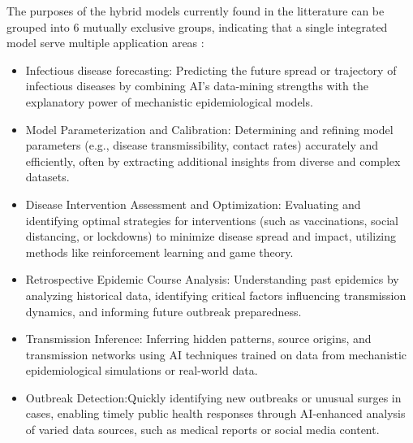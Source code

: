 The purposes of the hybrid models currently found in the litterature can be grouped into 6 mutually exclusive groups, indicating that a single integrated model serve multiple application areas \cite{Ye2025} :
\begin{itemize}
    \item Infectious disease forecasting: Predicting the future spread or trajectory of infectious diseases by combining AI's data-mining strengths with the explanatory power of mechanistic epidemiological models. \cite{Poirier2020, Fan2022, Garner2016, Kharazmi2021, Barmparis2022}
    \item Model Parameterization and Calibration: Determining and refining model parameters (e.g., disease transmissibility, contact rates) accurately and efficiently, often by extracting additional insights from diverse and complex datasets. \cite{Tuarob2015, SolaresHernandez2023, Reiker2021, Jorgensen2022, Raissi2019}
    \item Disease Intervention Assessment and Optimization: Evaluating and identifying optimal strategies for interventions (such as vaccinations, social distancing, or lockdowns) to minimize disease spread and impact, utilizing methods like reinforcement learning and game theory. \cite{Thiagarajan2022, Bertsimas2021, Aurell2022, Janko2023}
    \item Retrospective Epidemic Course Analysis: Understanding past epidemics by analyzing historical data, identifying critical factors influencing transmission dynamics, and informing future outbreak preparedness. \cite{Ruth2022, Santermans2015, Sanson2022, Weyant2023}
    \item Transmission Inference: Inferring hidden patterns, source origins, and transmission networks using AI techniques trained on data from mechanistic epidemiological simulations or real-world data. \cite{Ling2022, Colijn2014, Vilar2023}
    \item Outbreak Detection:Quickly identifying new outbreaks or unusual surges in cases, enabling timely public health responses through AI-enhanced analysis of varied data sources, such as medical reports or social media content.
\end{itemize}


